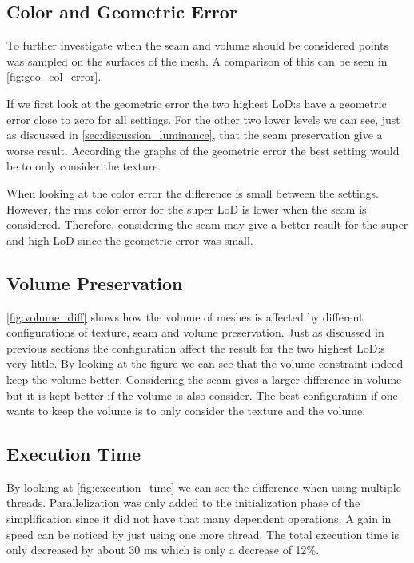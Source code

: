 \subsection{Color and Geometric Error} \label{sec:discussion_color_geom}
To further investigate when the seam and volume should be considered points was sampled on the surfaces of the mesh. A comparison of this can be seen in \cref{fig:geo_col_error}.

If we first look at the geometric error the two highest LoD:s have a geometric error close to zero for all settings. For the other two lower levels we can see, just as discussed in \cref{sec:discussion_luminance}, that the seam preservation give a worse result. According the graphs of the geometric error the best setting would be to only consider the texture.

When looking at the color error the difference is small between the settings. However, the rms color error for the super LoD is lower when the seam is considered. Therefore, considering the seam may give a better result for the super and high LoD since the geometric error was small.

\subsection{Volume Preservation} \label{sec:discussion_volume}
\cref{fig:volume_diff} shows how the volume of meshes is affected by different configurations of texture, seam and volume preservation. Just as discussed in previous sections the configuration affect the result for the two highest LoD:s very little. By looking at the figure we can see that the volume constraint indeed keep the volume better. Considering the seam gives a larger difference in volume but it is kept better if the volume is also consider. The best configuration if one wants to keep the volume is to only consider the texture and the volume.

\subsection{Execution Time} \label{sec:discussion_time}
By looking at \cref{fig:execution_time} we can see the difference when using multiple threads. Parallelization was only added to the initialization phase of the simplification since it did not have that many dependent operations. A gain in speed can be noticed by just using one more thread. The total execution time is only decreased by about 30 ms which is only a decrease of 12\%.

